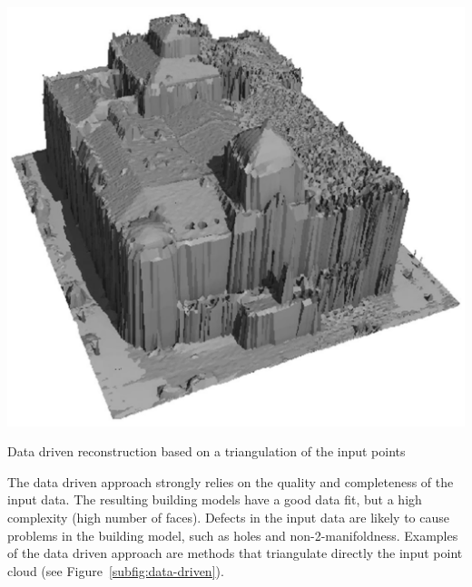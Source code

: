 \begin{marginfigure}
	\includegraphics[width=\linewidth]{figs/data-driven.png}
	\caption{Data driven reconstruction based on a triangulation of the input points \citep{Axelsson99}}%
	\label{subfig:data-driven}
\end{marginfigure}
The data driven approach strongly relies on the quality and completeness of the input data.
The resulting building models have a good data fit, but a high complexity (high number of faces).
Defects in the input data are likely to cause problems in the building model, such as holes and non-2-manifoldness.
Examples of the data driven approach are methods that triangulate directly the input point cloud (see Figure~\ref{subfig:data-driven}).

